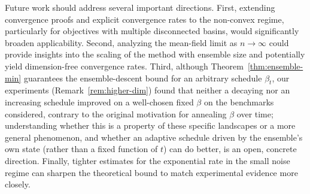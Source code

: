 \documentclass{opt2026} %
\begin{document}
Future work should address several important directions. First, extending convergence proofs and explicit convergence rates to the non-convex regime, particularly for objectives with multiple disconnected basins, would significantly broaden applicability. Second, analyzing the mean-field limit as $n \to \infty$ could provide insights into the scaling of the method with ensemble size and potentially yield dimension-free convergence rates. Third, although Theorem~\ref{thm:ensemble-min} guarantees the ensemble-descent bound for an arbitrary schedule $\beta_t$, our experiments (Remark~\ref{rem:higher-dim}) found that neither a decaying nor an increasing schedule improved on a well-chosen fixed $\beta$ on the benchmarks considered, contrary to the original motivation for annealing $\beta$ over time; understanding whether this is a property of these specific landscapes or a more general phenomenon, and whether an adaptive schedule driven by the ensemble's own state (rather than a fixed function of $t$) can do better, is an open, concrete direction. Finally, tighter estimates for the exponential rate in the small noise regime can sharpen the theoretical bound to match experimental evidence more closely.
\end{document}
